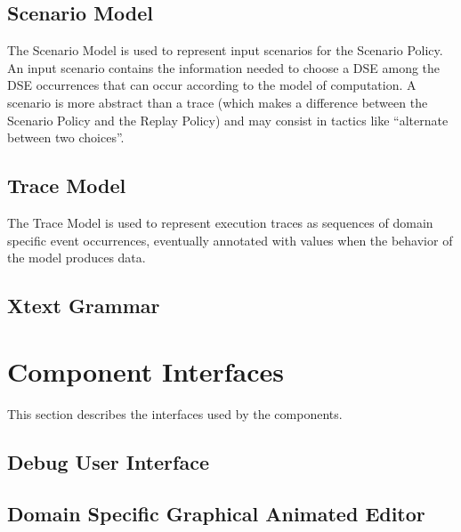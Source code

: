 \documentclass{gemoc} %
\begin{document}

\subsection{Scenario Model}
\label{sec:Scenario_Model}
The Scenario Model is used to represent input scenarios for the Scenario Policy. An input scenario contains the information needed to choose a DSE among the DSE occurrences that can occur according to the model of computation. A scenario is more abstract than a trace (which makes a difference between the Scenario Policy and the Replay Policy) and may consist in tactics like ``alternate between two choices''.

\subsection{Trace Model}
\label{sec:Trace_Model}
The Trace Model is used to represent execution traces as sequences of domain specific event occurrences, eventually annotated with values when the behavior of the model produces data.

\subsection{Xtext Grammar}
\label{sec:Xtext_Grammar}



\section{Component Interfaces}
This section describes the interfaces used by the components.
\subsection{Debug User Interface}
\label{sec:Debug_User_Interface}


\subsection{Domain Specific Graphical Animated Editor}
\label{sec:Domain_Specific_Graphical_Animated_Editor}
\end{document}
